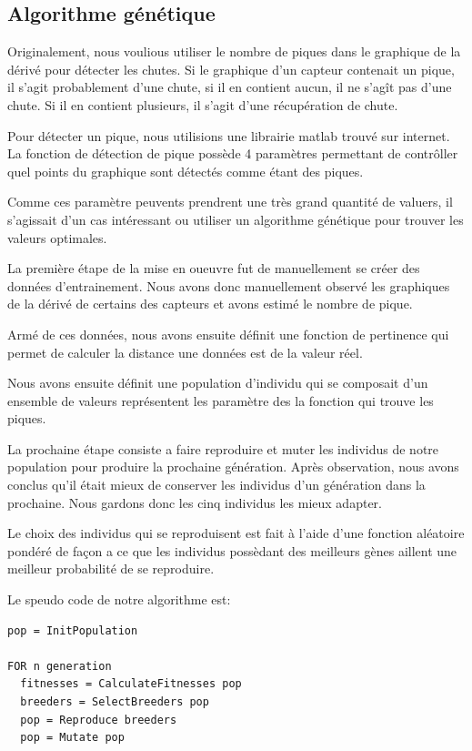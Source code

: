 \documentclass[12pt,letterpaper]{article}
\begin{document}
\subsection{Algorithme génétique}

Originalement, nous voulious utiliser le nombre de piques dans le graphique de la dérivé pour détecter les chutes.
Si le graphique d'un capteur contenait un pique, il s'agit probablement d'une chute, si il en contient aucun, il 
ne s'agît pas d'une chute. Si il en contient plusieurs, il s'agit d'une récupération de chute. 

Pour détecter un pique, nous utilisions une librairie matlab trouvé sur internet. La fonction de détection de pique
possède 4 paramètres permettant de contrôller quel points du graphique sont détectés comme étant des piques. 

Comme ces paramètre peuvents prendrent une très grand quantité de valuers, il s'agissait d'un cas intéressant ou utiliser
un algorithme génétique pour trouver les valeurs optimales. 

La première étape de la mise en oueuvre fut de manuellement se créer des données d'entrainement. Nous avons donc manuellement
observé les graphiques de la dérivé de certains des capteurs et avons estimé le nombre de pique. 

Armé de ces données, nous avons ensuite définit une fonction de pertinence qui permet de calculer la distance une données est de 
la valeur réel. 

Nous avons ensuite définit une population d'individu qui se composait d'un ensemble de valeurs représentent les paramètre des la
fonction qui trouve les piques. 

La prochaine étape consiste a faire reproduire et muter les individus de notre population pour produire la prochaine génération. Après 
observation, nous avons conclus qu'il était mieux de conserver les individus d'un génération dans la prochaine. Nous gardons donc les 
cinq individus les mieux adapter. 

Le choix des individus qui se reproduisent est fait à l'aide d'une fonction aléatoire pondéré de façon a ce que les individus possèdant
des meilleurs gènes aillent une meilleur probabilité de se reproduire. 

Le speudo code de notre algorithme est:

\begin{verbatim}
pop = InitPopulation

FOR n generation
  fitnesses = CalculateFitnesses pop
  breeders = SelectBreeders pop
  pop = Reproduce breeders
  pop = Mutate pop

\end{verbatim}
\end{document}
